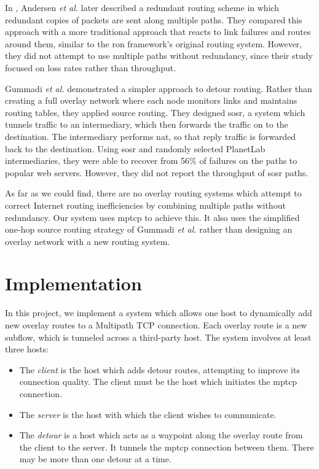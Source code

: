 \documentclass{cwru}
\begin{document}
In \cite{andersen2003best}, Andersen \textit{et al.} later described a redundant
routing scheme in which redundant copies of packets are sent along multiple
paths. They compared this approach with a more traditional approach that reacts
to link failures and routes around them, similar to the \ac{ron} framework's
original routing system. However, they did not attempt to use multiple paths
without redundancy, since their study focused on loss rates rather than
throughput.

Gummadi \textit{et al.} \cite{gummadi2004improving} demonstrated a simpler
approach to detour routing. Rather than creating a full overlay network where
each node monitors links and maintains routing tables, they applied source
routing. They designed \ac{sosr}, a system which tunnels traffic to an
intermediary, which then forwards the traffic on to the destination. The
intermediary performs \ac{nat}, so that reply traffic is forwarded back to the
destination. Using \ac{sosr} and randomly selected PlanetLab intermediaries,
they were able to recover from 56\% of failures on the paths to popular web
servers. However, they did not report the throughput of \ac{sosr} paths.

As far as we could find, there are no overlay routing systems which attempt to
correct Internet routing inefficiencies by combining multiple paths without
redundancy. Our system uses \ac{mptcp} to achieve this. It also uses the
simplified one-hop source routing strategy of Gummadi \textit{et al.}
\cite{gummadi2004improving} rather than designing an overlay network with a new
routing system.

\chapter{Implementation}
\label{c:impl}


In this project, we implement a system which allows one host to dynamically add
new overlay routes to a Multipath TCP connection. Each overlay route is a new
subflow, which is tunneled across a third-party host. The system involves at
least three hosts:
\begin{itemize}
\item The \emph{client} is the host which adds detour routes, attempting to
  improve its connection quality. The client must be the host which initiates
  the \ac{mptcp} connection.
\item The \emph{server} is the host with which the client wishes to communicate.
\item The \emph{detour} is a host which acts as a waypoint along the overlay
  route from the client to the server. It tunnels the \ac{mptcp} connection
  between them. There may be more than one detour at a time.
\end{itemize}
\end{document}
